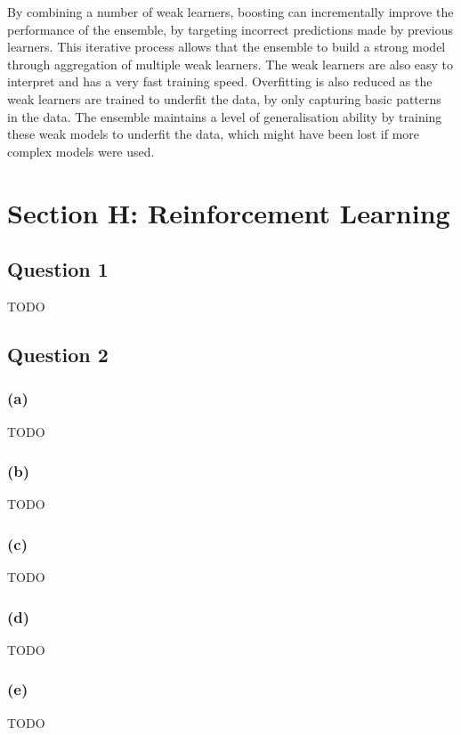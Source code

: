 \documentclass[10pt]{article}
\begin{document}
By combining a number of weak learners, boosting can incrementally improve the performance of
the ensemble, by targeting incorrect predictions made by previous learners. This iterative process
allows that the ensemble to build a strong model through aggregation of multiple weak learners.
The weak learners are also easy to interpret and has a very fast training speed. Overfitting is also
reduced as the weak learners are trained to underfit the data, by only capturing basic patterns in the data.
The ensemble maintains a level of generalisation ability by training these weak models to underfit the data, which
might have been lost if more complex models were used.

\section*{Section H: Reinforcement Learning}

\subsection*{Question 1}

TODO

\subsection*{Question 2}

\subsubsection*{(a)}

TODO

\subsubsection*{(b)}

TODO

\subsubsection*{(c)}

TODO

\subsubsection*{(d)}

TODO

\subsubsection*{(e)}

TODO

 

\end{document}
